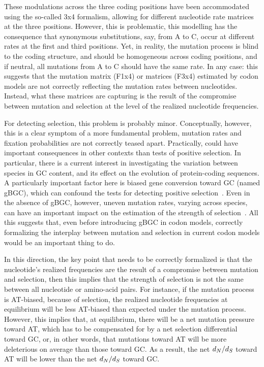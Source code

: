 These modulations across the three coding positions have been accommodated using the so-called 3x4 formalism, allowing for different nucleotide rate matrices at the three positions.
However, this is problematic, this modelling has the consequence that synonymous substitutions, say, from A to C, occur at different rates at the first and third positions.
Yet, in reality, the mutation process is blind to the coding structure, and should be homogeneous across coding positions, and if neutral, all mutations from A to C should have the same rate.
In any case: this suggests that the mutation matrix (F1x4) or matrices (F3x4) estimated by codon models are not correctly reflecting the mutation rates between nucleotides.
Instead, what these matrices are capturing is the result of the compromise between mutation and selection at the level of the realized nucleotide frequencies.

For detecting selection, this problem is probably minor.
Conceptually, however, this is a clear symptom of a more fundamental problem, mutation rates and fixation probabilities are not correctly teased apart.
Practically, could have important consequences in other contexts than tests of positive selection.
In particular, there is a current interest in investigating the variation between species in GC content, and its effect on the evolution of protein-coding sequences.
A particularly important factor here is biased gene conversion toward GC (named gBGC), which can confound the tests for detecting positive selection~\citep{Galtier2009,Ratnakumar2010, Figuet2014}.
Even in the absence of gBGC, however, uneven mutation rates, varying across species, can have an important impact on the estimation of the strength of selection~\citep{Galtier2009,Ratnakumar2010, Figuet2014}.
All this suggests that, even before introducing gBGC in codon models, correctly formalizing the interplay between mutation and selection in current codon models would be an important thing to do.

In this direction, the key point that needs to be correctly formalized is that the nucleotide's realized frequencies are the result of a compromise between mutation and selection, then this implies that the strength of selection is not the same between all nucleotide or amino-acid pairs.
For instance, if the mutation process is AT-biased, because of selection, the realized nucleotide frequencies at equilibrium will be less AT-biased than expected under the mutation process.
However, this implies that, at equilibrium, there will be a net mutation pressure toward AT, which has to be compensated for by a net selection differential toward GC, or, in other words, that mutations toward AT will be more deleterious on average than those toward GC.
As a result, the net $d_N / d_S$ toward AT will be lower than the net $d_N / d_S$ toward GC.

